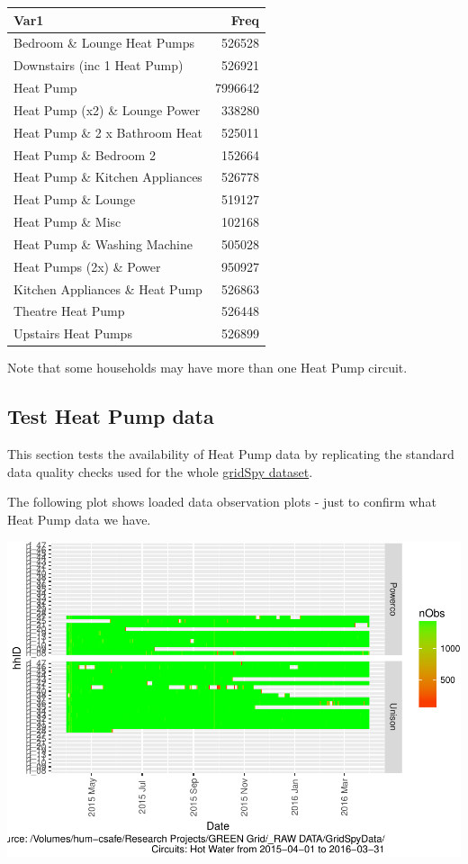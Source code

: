 \documentclass[]{article}
\begin{document}
\begin{longtable}[]{@{}lr@{}}
\toprule
Var1 & Freq\tabularnewline
\midrule
\endhead
Bedroom \& Lounge Heat Pumps & 526528\tabularnewline
Downstairs (inc 1 Heat Pump) & 526921\tabularnewline
Heat Pump & 7996642\tabularnewline
Heat Pump (x2) \& Lounge Power & 338280\tabularnewline
Heat Pump \& 2 x Bathroom Heat & 525011\tabularnewline
Heat Pump \& Bedroom 2 & 152664\tabularnewline
Heat Pump \& Kitchen Appliances & 526778\tabularnewline
Heat Pump \& Lounge & 519127\tabularnewline
Heat Pump \& Misc & 102168\tabularnewline
Heat Pump \& Washing Machine & 505028\tabularnewline
Heat Pumps (2x) \& Power & 950927\tabularnewline
Kitchen Appliances \& Heat Pump & 526863\tabularnewline
Theatre Heat Pump & 526448\tabularnewline
Upstairs Heat Pumps & 526899\tabularnewline
\bottomrule
\end{longtable}

Note that some households may have more than one Heat Pump circuit.

\subsection{Test Heat Pump data}\label{test-heat-pump-data}

This section tests the availability of Heat Pump data by replicating the
standard data quality checks used for the whole
\href{https://git.soton.ac.uk/ba1e12/nzGREENGrid/tree/master/dataProcessing/gridSpy}{gridSpy
dataset}.

The following plot shows loaded data observation plots - just to confirm
what Heat Pump data we have.

\includegraphics{nzGGHouseholdPowerDemandProfile_Heat Pump_2015-04-01_2016-03-31_files/figure-latex/loadedFilesObs Tile Plot-1.pdf}
\end{document}
